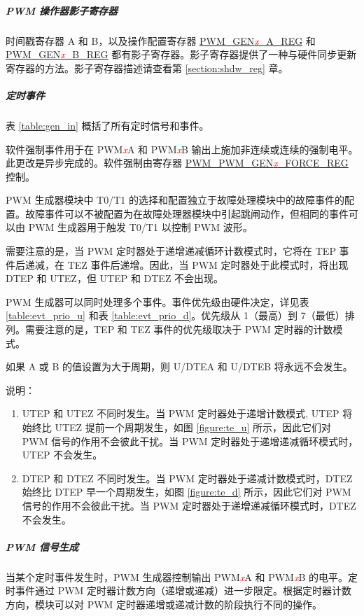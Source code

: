 \documentclass[main\_\_CN.tex]{subfiles}
\begin{document}
\subparagraph{PWM 操作器影子寄存器}
时间戳寄存器 A 和 B，以及操作配置寄存器 \hyperref[regdesc:PWMGEN0AREG]{PWM\_GEN\textcolor{red}{\it{x}}\_A\_REG} 和 \hyperref[regdesc:PWMGEN0BREG]{PWM\_GEN\textcolor{red}{\it{x}}\_B\_REG} 都有影子寄存器。影子寄存器提供了一种与硬件同步更新寄存器的方法。影子寄存器描述请查看第 \ref{section:shdw_reg} 章。

\subparagraph{定时事件}
表 \ref{table:gen_in} 概括了所有定时信号和事件。


软件强制事件用于在 PWM\textcolor{red}{\it{x}}A 和 PWM\textcolor{red}{\it{x}}B 输出上施加非连续或连续的强制电平。此更改是异步完成的。软件强制由寄存器 \hyperref[regdesc:PWMGEN0FORCEREG]{PWM\_PWM\_GEN\textcolor{red}{\it{x}}\_FORCE\_REG} 控制。

PWM 生成器模块中 T0/T1 的选择和配置独立于故障处理模块中的故障事件的配置。故障事件可以不被配置为在故障处理器模块中引起跳闸动作，但相同的事件可以由 PWM 生成器用于触发 T0/T1 以控制 PWM 波形。

需要注意的是，当 PWM 定时器处于递增递减循环计数模式时，它将在 TEP 事件后递减，在 TEZ 事件后递增。因此，当 PWM 定时器处于此模式时，将出现 DTEP 和 UTEZ，但 UTEP 和 DTEZ 不会出现。

PWM 生成器可以同时处理多个事件。事件优先级由硬件决定，详见表 \ref{table:evt_prio_u} 和表 \ref{table:evt_prio_d}。优先级从 1（最高）到 7（最低）排列。需要注意的是，TEP 和 TEZ 事件的优先级取决于 PWM 定时器的计数模式。

如果 A 或 B 的值设置为大于周期，则 U/DTEA 和 U/DTEB 将永远不会发生。



说明：
\begin{enumerate}
    \item UTEP 和 UTEZ 不同时发生。当 PWM 定时器处于递增计数模式, UTEP 将始终比 UTEZ 提前一个周期发生，如图 \ref{figure:te_u} 所示，因此它们对 PWM 信号的作用不会彼此干扰。当 PWM 定时器处于递增递减循环模式时，UTEP 不会发生。
    \item DTEP 和 DTEZ 不同时发生。当 PWM 定时器处于递减计数模式时，DTEZ 始终比 DTEP 早一个周期发生，如图 \ref{figure:te_d} 所示，因此它们对 PWM 信号的作用不会彼此干扰。当 PWM 定时器处于递增递减循环模式时，DTEZ 不会发生。
\end{enumerate}

\subparagraph{PWM 信号生成}
当某个定时事件发生时，PWM 生成器控制输出 PWM\textcolor{red}{\it{x}}A 和 PWM\textcolor{red}{\it{x}}B 的电平。定时事件通过 PWM 定时器计数方向（递增或递减）进一步限定。根据定时器计数方向，模块可以对 PWM 定时器递增或递减计数的阶段执行不同的操作。
\end{document}
